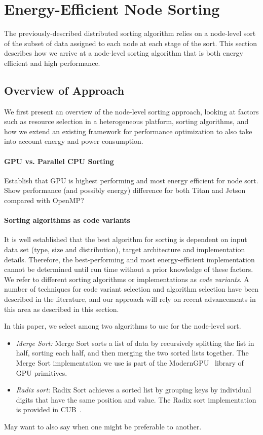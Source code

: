 \section{Energy-Efficient Node Sorting}
The previously-described distributed sorting algorithm relies
on a node-level sort of the subset of data assigned to each node at 
each stage of the sort.  This section describes how we arrive 
at a node-level sorting algorithm that is both energy efficient and
high performance.  

\subsection{Overview of Approach}
We first present an overview of the node-level sorting approach, 
looking at factors such as resource selection in a heterogeneous platform, 
sorting algorithms, and how we extend an existing framework for performance
optimization to also take into account energy and power consumption.

\paragraph{GPU vs. Parallel CPU Sorting}
{\color{red}Establish that GPU is highest performing and most energy efficient for node sort.
Show performance (and possibly energy) 
difference for both Titan and Jetson compared with OpenMP?}  

\paragraph{Sorting algorithms as code variants}
It is well established that the best algorithm for sorting
is dependent on input data set (type, size and distribution), target 
architecture and implementation details.   Therefore, the best-performing
and most energy-efficient implementation cannot
be determined until run time without a prior knowledge of these factors.
We refer to different sorting algorithms or implementations
as \emph{code variants}.  
A number of techniques for code variant selection and algorithm
selection have been described in the literature, and our approach
will rely on recent advancements in this area as described in this section.
 
In this paper, we select among two algorithms to use for
the node-level sort.  
\begin{itemize}
\item \emph{Merge Sort:}
Merge Sort sorts a list of data by 
recursively splitting the list in half, sorting each half,
and then merging the two sorted lists together.
The Merge Sort implementation we use is
part of the ModernGPU~\cite{modernGPU} library of GPU
primitives.  
\item \emph{Radix sort:}
Radix Sort achieves a sorted list by grouping keys by individual digits  
that have the same position and value.
The Radix sort implementation is provided in CUB~\cite{cub}. 
\end{itemize}
{\color{red} May want to also say when one might be preferable to another.}

